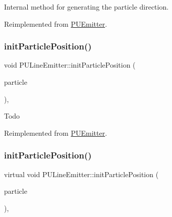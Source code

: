 Internal method for generating the particle direction. 

Reimplemented from \hyperlink{classPUEmitter_a0dffa0a17008ddaaec73c6042ea1a019}{P\+U\+Emitter}.

\mbox{\label{classPULineEmitter_a45329bb73318a8b5c356e7ae3ce0da95}} 
\subsubsection{\texorpdfstring{init\+Particle\+Position()}{initParticlePosition()}\hspace{0.1cm}{\footnotesize\ttfamily [1/2]}}
{\footnotesize\ttfamily void P\+U\+Line\+Emitter\+::init\+Particle\+Position (\begin{DoxyParamCaption}\item[{\hyperlink{structPUParticle3D}{P\+U\+Particle3D} $\ast$}]{particle }\end{DoxyParamCaption})\hspace{0.3cm}{\ttfamily [override]}, {\ttfamily [virtual]}}

Todo 

Reimplemented from \hyperlink{classPUEmitter_a2449f31b73c94a55f6559be71d56ca61}{P\+U\+Emitter}.

\mbox{\label{classPULineEmitter_af448c4a0d07befdcdd1d28d7fddacb03}} 
\subsubsection{\texorpdfstring{init\+Particle\+Position()}{initParticlePosition()}\hspace{0.1cm}{\footnotesize\ttfamily [2/2]}}
{\footnotesize\ttfamily virtual void P\+U\+Line\+Emitter\+::init\+Particle\+Position (\begin{DoxyParamCaption}\item[{\hyperlink{structPUParticle3D}{P\+U\+Particle3D} $\ast$}]{particle }\end{DoxyParamCaption})\hspace{0.3cm}{\ttfamily [override]}, {\ttfamily [virtual]}}

